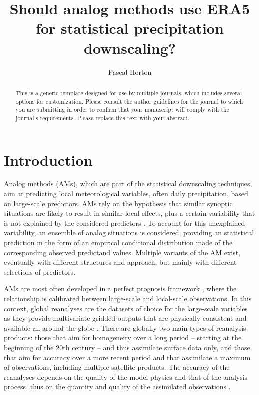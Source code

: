\documentclass[alpha-refs]{wiley-article}
\title{Should analog methods use ERA5 for statistical precipitation downscaling? }
\author[1]{Pascal Horton}
\affil[1]{Oeschger Centre for Climate Change Research and Institute of Geography, University of Bern, Bern, Switzerland}
\begin{document}
\maketitle

\begin{abstract}
This is a generic template designed for use by multiple journals, which includes several options for customization. Please consult the author guidelines for the journal to which you are submitting in order to confirm that your manuscript will comply with the journal's requirements. Please replace this text with your abstract.

\end{abstract}

\section{Introduction}

Analog methods (AMs), which are part of the statistical downscaling techniques, aim at predicting local meteorological variables, often daily precipitation, based on large-scale predictors. AMs rely on the hypothesis that similar synoptic situations are likely to result in similar local effects, plus a certain variability that is not explained by the considered predictors \citep{Lorenz1969}. To account for this unexplained variability, an ensemble of analog situations is considered, providing an statistical prediction in the form of an empirical conditional distribution made of the corresponding observed predictand values. Multiple variants of the AM exist, eventually with different structures and approach, but mainly with different selections of predictors.

AMs are most often developed in a perfect prognosis framework \citep{Rummukainen1997, Maraun2010}, where the relationship is calibrated between large-scale and local-scale observations. In this context, global reanalyses are the datasets of choice for the large-scale variables as they provide multivariate gridded outputs that are physically consistent and available all around the globe \citep{Gelaro2017}. There are globally two main types of reanalysis products: those that aim for homogeneity over a long period -- starting at the beginning of the 20th century -- and thus assimilate surface data only, and those that aim for accuracy over a more recent period and that assimilate a maximum of observations, including multiple satellite products. The accuracy of the reanalyses depends on the quality of the model physics and that of the analysis process, thus on the quantity and quality of the assimilated observations \citep{Dee2011a}.
\end{document}
